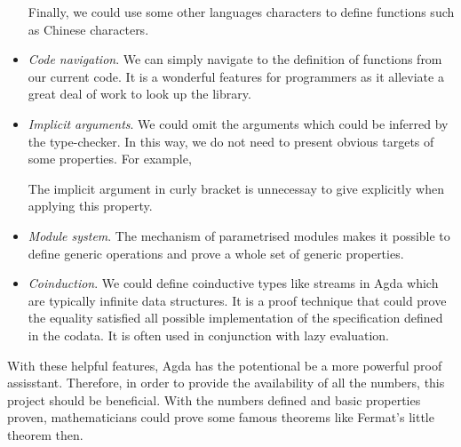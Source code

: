 \documentclass{article}
\newcommand{\Varid}[1]{\mathit{#1}}
\def\resethooks{%
  \global\let\SaveRestoreHook\empty
  \global\let\ColumnHook\empty}
\newlength{\blanklineskip}
\let\hspre\empty
\let\hspost\empty
\renewcommand\Varid[1]{\mathord{\textsf{#1}}}
\theoremstyle{definition}
\begin{document}
\begin{itemize}
Finally, we could use some other languages characters to define functions such as Chinese characters.

\item \textit{Code navigation}. We can simply navigate to the definition of functions from our current code. It is a wonderful features for programmers as it alleviate a great deal of work to look up the library.

\item \textit{Implicit arguments}. We could omit the arguments which could be inferred by the type-checker. In this way, we do not need to present obvious targets of some properties. For example,

\resethooks

The implicit argument in curly bracket is unnecessay to give explicitly when applying this property.


\item \textit{Module system}. The mechanism of parametrised modules makes it possible to define generic operations and prove a whole set of generic properties.

\item \textit{Coinduction}. We could define coinductive types like streams in Agda which are typically infinite data structures. It is a proof technique that could prove the equality satisfied all possible implementation of the specification defined in the codata. It is often used in conjunction with lazy evaluation. \cite{wiki:Coinduction}
	
\end{itemize} 

With these helpful features, Agda has the potentional be a more powerful proof assisstant. Therefore, in order to provide the availability of all the numbers, this project should be beneficial. With the numbers defined and basic properties proven, mathematicians could prove some famous theorems like Fermat’s little theorem then.
\end{document}
